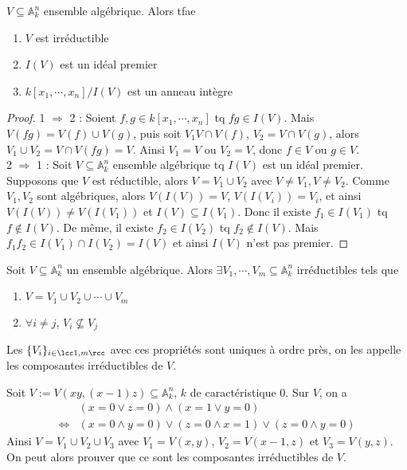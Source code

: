         \begin{prop}
            $V \subseteq \mathbb{A}_k^n$ ensemble algébrique. Alors tfae
            \begin{enumerate}
                \item $V$ est irréductible
                \item $I(V)$ est un idéal premier
                \item $k[x_1, \cdots, x_n]/I(V)$ est un anneau intègre
            \end{enumerate}
        \end{prop}
        \begin{proof}
            1 $\Rightarrow$ 2 : Soient $f,g \in k[x_1, \cdots, x_n]$ tq $fg \in I(V)$. Mais $V(fg) = V(f) \cup V(g)$, puis soit $V_1  V \cap V(f)$, $V_2 = V \cap V(g)$, alors $V_1 \cup V_2 = V \cap V(fg) = V$. Ainsi $V_1 = V$ ou $V_2 = V$, donc $f \in V$ ou $g \in V$. \\
            2 $\Rightarrow$ 1 : Soit $V \subseteq \mathbb{A}_k^n$ ensemble algébrique tq $I(V)$ est un idéal premier. Supposons que $V$ est réductible, alors $V = V_1 \cup V_2$ avec $V \neq V_1, V \neq V_2$. Comme $V_1,V_2$ sont algébriques, alors $V(I(V)) = V$, $V(I(V_i)) = V_i$, et ainsi $V(I(V)) \neq V(I(V_1))$ et $I(V) \subseteq I(V_1)$. Donc il existe $f_1 \in I(V_1)$ tq $f \notin I(V)$. De même, il existe $f_2 \in I(V_2)$ tq $f_2 \notin I(V)$. Mais $f_1f_2 \in I(V_1) \cap I(V_2) = I(V)$ et ainsi $I(V)$ n'est pas premier.
        \end{proof}
        \begin{theo}
            Soit $V \subseteq \mathbb{A}_k^n$ un ensemble algébrique. Alors $\exists V_1, \cdots, V_m \subseteq \mathbb{A}_k^n$ irréductibles tels que
            \begin{enumerate}
                \item $V = V_1 \cup V_2 \cup \cdots \cup V_m$
                \item $\forall i \neq j$, $V_i \nsubseteq V_j$
            \end{enumerate}
            Les $\{V_i\}_{i \in \lcc 1,m \rcc}$ avec ces propriétés sont uniques à ordre près, on les appelle les composantes irréductibles de $V$.
        \end{theo}
        \begin{expl}
            Soit $V := V(xy, (x-1)z) \subseteq \mathbb{A}_k^n$, $k$ de caractéristique $0$. Sur $V$, on a 
            \begin{align*}
                &(x = 0 \lor z = 0) \land (x = 1 \lor y = 0) \\
                \iff &(x = 0 \land y = 0) \lor (z = 0 \land x = 1) \lor (z = 0 \land y = 0)
            \end{align*}
            Ainsi $V = V_1 \cup V_2 \cup V_3$ avec $V_1 = V(x,y)$, $V_2 = V(x-1, z)$ et $V_3 = V(y,z)$. On peut alors prouver que ce sont les composantes irréductibles de $V$.
        \end{expl}
